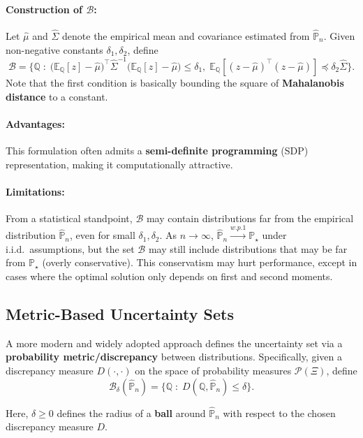 \documentclass[11pt]{report}
\begin{document}
\paragraph{Construction of $\mathcal{B}$:}
Let $\hat{\mu}$ and $\hat{\Sigma}$ denote the empirical mean and covariance estimated from $\hat{\mathbb{P}}_n$.  
Given non-negative constants $\delta_1, \delta_2$, define
\[
    \mathcal{B} = \Bigg\{ \mathbb{Q} \;:\;
    \big(\mathbb{E}_\mathbb{Q}[z] - \hat{\mu}\big)^\top \hat{\Sigma}^{-1}\big(\mathbb{E}_\mathbb{Q}[z] - \hat{\mu}\big) \leq \delta_1, \;
    \mathbb{E}_\mathbb{Q}\!\left[(z - \hat{\mu})^\top(z - \hat{\mu}) \right] \preceq \delta_2 \hat{\Sigma}
    \Bigg\}.
\]
Note that the first condition is basically bounding the square of \textbf{Mahalanobis distance} to a constant.

\paragraph{Advantages:}
This formulation often admits a \textbf{semi-definite programming} (SDP) representation, making it computationally attractive.  

\paragraph{Limitations:}
From a statistical standpoint, $\mathcal{B}$ may contain distributions far from the empirical distribution $\hat{\mathbb{P}}_n$, even for small $\delta_1, \delta_2$. 
As $n \to \infty$, $\hat{\mathbb{P}}_n \overset{w.p. 1}{\rightarrow} \mathbb{P}_\star$ under i.i.d.\ assumptions, but the set $\mathcal{B}$ may still include distributions that may be far from $\mathbb{P_\star}$ (overly conservative). 
This conservatism may hurt performance, except in cases where the optimal solution only depends on first and second moments.  

\subsection{Metric-Based Uncertainty Sets}
A more modern and widely adopted approach defines the uncertainty set via a \textbf{probability metric/discrepancy} between distributions.  
Specifically, given a discrepancy measure $D(\cdot, \cdot)$ on the space of probability measures $\mathcal{P}(\Xi)$, define
\[
    \mathcal{B}_\delta(\hat{\mathbb{P}}_n) = \big\{ \mathbb{Q} \;:\; D(\mathbb{Q}, \hat{\mathbb{P}}_n) \leq \delta \big\}.
\]

Here, $\delta \geq 0$ defines the radius of a \textbf{ball} around $\hat{\mathbb{P}}_n$ with respect to the chosen discrepancy measure $D$.  
\end{document}
